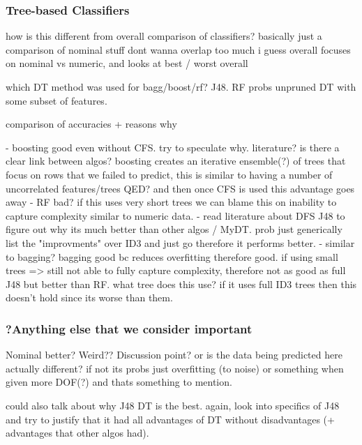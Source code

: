 \subsubsection{Tree-based Classifiers}


how is this different from overall comparison of classifiers? basically just a comparison of nominal stuff
dont wanna overlap too much
i guess overall focuses on nominal vs numeric, and looks at best / worst overall

which DT method was used for bagg/boost/rf? J48. 
RF probs unpruned DT with some subset of features.

comparison of accuracies + reasons why


- boosting good even without CFS. try to speculate why. literature? is there a clear link between algos? boosting creates an iterative ensemble(?) of trees that focus on rows that we failed to predict, this is similar to having a number of uncorrelated features/trees QED? and then once CFS is used this advantage goes away
- RF bad? if this uses very short trees we can blame this on inability to capture complexity similar to numeric data.
- read literature about DFS J48 to figure out why its much better than other algos / MyDT. prob just generically list the "improvments" over ID3 and just go therefore it performs better.
- similar to bagging? bagging good bc reduces overfitting therefore good. if using small trees => still not able to fully capture complexity, therefore not as good as full J48 but better than RF. what tree does this use? if it uses full ID3 trees then this doesn't hold since its worse than them.


\subsubsection{?Anything else that we consider important}

Nominal better? Weird?? Discussion point?
or is the data being predicted here actually different? if not its probs just overfitting (to noise) or something when given more DOF(?) and thats something to mention.


could also talk about why J48 DT is the best. again, look into specifics of J48 and try to justify that it had all advantages of DT without disadvantages (+ advantages that other algos had).
